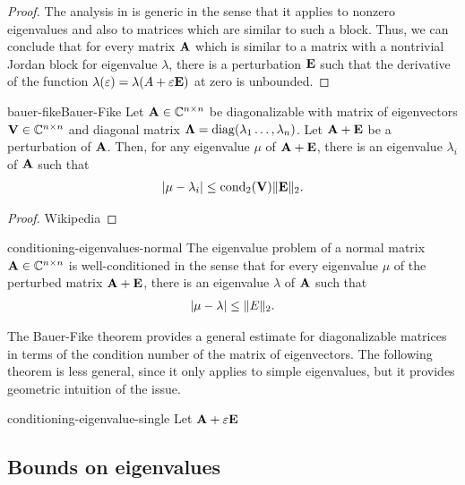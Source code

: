 \begin{proof}
  The analysis in  is
  generic in the sense that it applies to nonzero eigenvalues and also
  to matrices which are similar to such a block. Thus, we can conclude
  that for every matrix $\mathbf A$ which is similar to a matrix with a
  nontrivial Jordan block for eigenvalue $\lambda$, there is a
  perturbation $\mathbf E$ such that the derivative of the function
  $\lambda(\varepsilon) = \lambda(A+\varepsilon\mathbf E)$ at zero is unbounded.
\end{proof}

\begin{Theorem*}{bauer-fike}{Bauer-Fike}
  Let $\mathbf A\in \mathbb C^{n\times n}$ be diagonalizable with matrix of eigenvectors
  $\mathbf V \in \mathbb C^{n\times n}$ and diagonal matrix
  $\boldsymbol\Lambda = \operatorname{diag}(\lambda_1\dots,\lambda_n)$. Let $\mathbf A+\mathbf E$ be
  a perturbation of $\mathbf A$. Then, for any eigenvalue $\mu$ of
  $\mathbf A+\mathbf E$, there is an eigenvalue $\lambda_i$ of $\mathbf A$ such
  that
  \begin{gather}
    \lvert\mu-\lambda_i\rvert \le \operatorname{cond}_2(\mathbf V) \lVert\mathbf E\rVert_2.
  \end{gather}
\end{Theorem*}

\begin{proof}
  Wikipedia
\end{proof}

\begin{Corollary}{conditioning-eigenvalues-normal}
  The eigenvalue problem of a normal matrix $\mathbf A\in\mathbb C^{n\times n}$ is
  well-conditioned in the sense that for every eigenvalue $\mu$ of the
  perturbed matrix $\mathbf A+\mathbf E$, there is an eigenvalue $\lambda$ of
  $\mathbf A$ such that
  \begin{gather}
    \lvert\mu-\lambda\rvert \le \lVert E\rVert_2.
  \end{gather}
\end{Corollary}

The Bauer-Fike theorem provides a general estimate for diagonalizable
matrices in terms of the condition number of the matrix of
eigenvectors. The following theorem is less general, since it only
applies to simple eigenvalues, but it provides geometric intuition of
the issue.

\begin{Theorem}{conditioning-eigenvalue-single}
  Let $\mathbf A+\varepsilon\mathbf E$
\end{Theorem}

\subsection{Bounds on eigenvalues}

